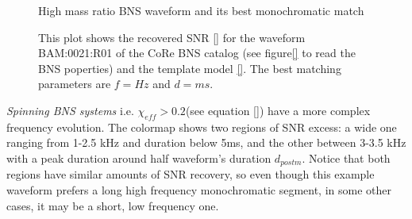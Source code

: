 \begin{figure}[!htbp]
\begin{center}
\begin{minipage}[t]{0.5\linewidth}
\end{minipage}
\captionsetup{width=0.8\textwidth}
\caption{High mass ratio BNS waveform and its best monochromatic match}
\caption*{This plot shows the recovered SNR \ref{} for the waveform BAM:0021:R01 of the CoRe BNS catalog \cite{}(see figure\ref{} to read the BNS poperties) and the template model \ref{}. The best matching parameters are $f=Hz$ and $d=ms$.}
\end{center}
\end{figure}

\FloatBarrier


\newpage

\textit{Spinning BNS systems} i.e. $\chi_{eff}>0.2$(see equation \ref{}) have a more complex frequency evolution. The colormap shows two regions of SNR excess: a wide one ranging from 1-2.5 kHz and duration below 5ms, and the other between 3-3.5 kHz with a peak duration around half waveform's duration $d_{postm}$. Notice that both regions have similar amounts of SNR recovery, so even though this example waveform prefers a long high frequency monochromatic segment, in some other cases, it may be a short, low frequency one.

